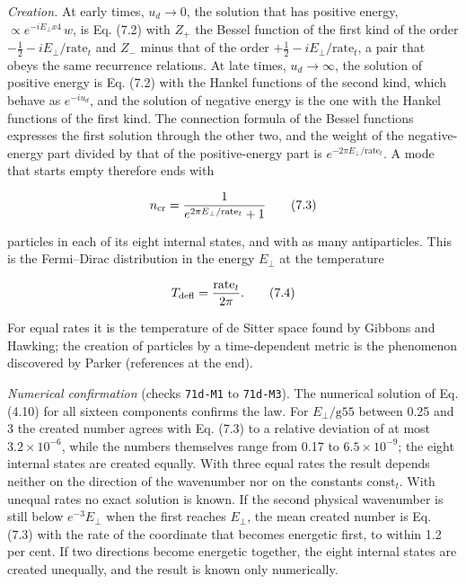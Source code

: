 \documentclass[
  10pt,
]{article}
\begin{document}
\emph{Creation.} At early times, \(u_d\to0\), the solution that has
positive energy, \(\propto e^{-iE_\perp x4}\,w\), is Eq. (7.2) with
\(Z_+\) the Bessel function of the first kind of the order
\(-\tfrac12-iE_\perp/\mathrm{rate}_t\) and \(Z_-\) minus that of the
order \(+\tfrac12-iE_\perp/\mathrm{rate}_t\), a pair that obeys the same
recurrence relations. At late times, \(u_d\to\infty\), the solution of
positive energy is Eq. (7.2) with the Hankel functions of the second
kind, which behave as \(e^{-iu_d}\), and the solution of negative energy
is the one with the Hankel functions of the first kind. The connection
formula of the Bessel functions expresses the first solution through the
other two, and the weight of the negative-energy part divided by that of
the positive-energy part is \(e^{-2\pi E_\perp/\mathrm{rate}_t}\). A
mode that starts empty therefore ends with

\[n_{\rm cr}=\frac{1}{e^{2\pi E_\perp/\mathrm{rate}_t}+1}\tag{7.3}\]

particles in each of its eight internal states, and with as many
antiparticles. This is the Fermi--Dirac distribution in the energy
\(E_\perp\) at the temperature

\[T_{\rm defl}=\frac{\mathrm{rate}_t}{2\pi}.\tag{7.4}\]

For equal rates it is the temperature of de Sitter space found by
Gibbons and Hawking; the creation of particles by a time-dependent
metric is the phenomenon discovered by Parker (references at the end).

\emph{Numerical confirmation} (checks \texttt{71d-M1} to
\texttt{71d-M3}). The numerical solution of Eq. (4.10) for all sixteen
components confirms the law. For \(E_\perp/\mathrm{g55}\) between 0.25
and 3 the created number agrees with Eq. (7.3) to a relative deviation
of at most \(3.2\times10^{-6}\), while the numbers themselves range from
0.17 to \(6.5\times10^{-9}\); the eight internal states are created
equally. With three equal rates the result depends neither on the
direction of the wavenumber nor on the constants \(\mathrm{const}_t\).
With unequal rates no exact solution is known. If the second physical
wavenumber is still below \(e^{-3}E_\perp\) when the first reaches
\(E_\perp\), the mean created number is Eq. (7.3) with the rate of the
coordinate that becomes energetic first, to within 1.2 per cent. If two
directions become energetic together, the eight internal states are
created unequally, and the result is known only numerically.
\end{document}
